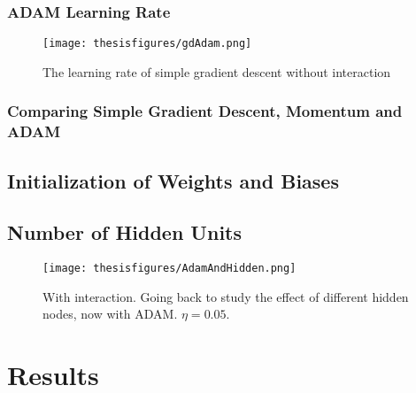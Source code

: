 \documentclass[twoside,english]{uiofysmaster}
\begin{document}
\subsubsection{ADAM Learning Rate}

\begin{figure}
\centering
 \texttt{[image: thesisfigures/gdAdam.png]}
 \caption{The learning rate of simple gradient descent without interaction}
 \label{fig:gdAdam}
\end{figure}



\subsubsection{Comparing Simple Gradient Descent, Momentum and ADAM}




\subsection{Initialization of Weights and Biases}




\subsection{Number of Hidden Units}



\begin{figure}
\centering
 \texttt{[image: thesisfigures/AdamAndHidden.png]}
 \caption{With interaction. Going back to study the effect of different hidden nodes, now with ADAM. $\eta=0.05$.}
 \label{fig:AdamAndHidden}
\end{figure}




\section{Results}



\newpage

\end{document}
